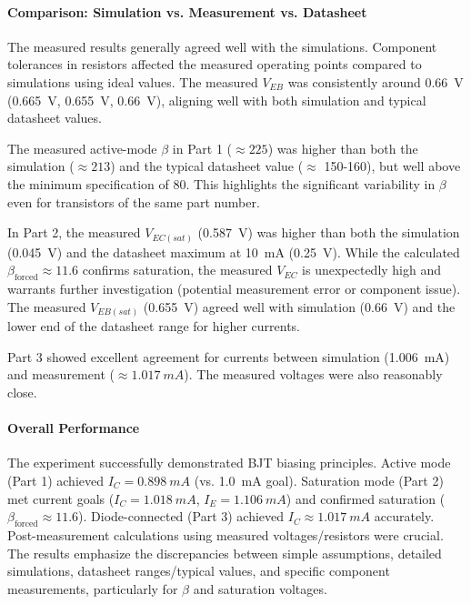\documentclass[12pt]{article}
\begin{document}
\paragraph{Comparison: Simulation vs. Measurement vs. Datasheet}
The measured results generally agreed well with the simulations. Component tolerances in resistors affected the measured operating points compared to simulations using ideal values. The measured $V_{EB}$ was consistently around \SI{0.66}{\volt} (\SI{0.665}{\volt}, \SI{0.655}{\volt}, \SI{0.66}{\volt}), aligning well with both simulation and typical datasheet values.

The measured active-mode $\beta$ in Part 1 ($\approx 225$) was higher than both the simulation ($\approx 213$) and the typical datasheet value ($\approx$ 150-160), but well above the minimum specification of 80. This highlights the significant variability in $\beta$ even for transistors of the same part number.

In Part 2, the measured $V_{EC(sat)}$ (\SI{0.587}{\volt}) was higher than both the simulation (\SI{0.045}{\volt}) and the datasheet maximum at \SI{10}{mA} (\SI{0.25}{V}). While the calculated $\beta_{\text{forced}} \approx 11.6$ confirms saturation, the measured $V_{EC}$ is unexpectedly high and warrants further investigation (potential measurement error or component issue). The measured $V_{EB(sat)}$ (\SI{0.655}{\volt}) agreed well with simulation (\SI{0.66}{\volt}) and the lower end of the datasheet range for higher currents.

Part 3 showed excellent agreement for currents between simulation (\SI{1.006}{mA}) and measurement ($\approx \SI{1.017}{mA}$). The measured voltages were also reasonably close.

\paragraph{Overall Performance}
The experiment successfully demonstrated BJT biasing principles. Active mode (Part 1) achieved $I_C = \SI{0.898}{mA}$ (vs. \SI{1.0}{mA} goal). Saturation mode (Part 2) met current goals ($I_C=\SI{1.018}{mA}$, $I_E=\SI{1.106}{mA}$) and confirmed saturation ($\beta_{\text{forced}} \approx 11.6$). Diode-connected (Part 3) achieved $I_C \approx \SI{1.017}{mA}$ accurately. Post-measurement calculations using measured voltages/resistors were crucial. The results emphasize the discrepancies between simple assumptions, detailed simulations, datasheet ranges/typical values, and specific component measurements, particularly for $\beta$ and saturation voltages.
\end{document}
